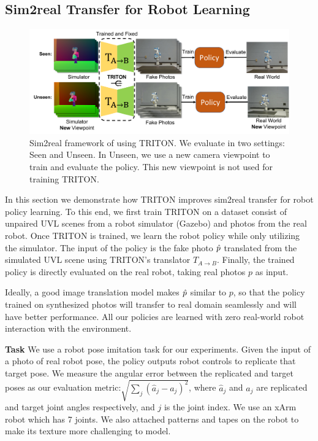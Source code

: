 \documentclass{article}
\begin{document}
\subsection{Sim2real Transfer for Robot Learning}
\begin{figure}[thbp]
    \centering
    \vspace{-10pt}
    \includegraphics[width=.8\textwidth]{../images/sim2real_framework.pdf}
    \vspace{-10pt}
    \caption{Sim2real framework of using TRITON. We evaluate in two settings: Seen and Unseen. In Unseen, we use a new camera viewpoint to train and evaluate the policy. This new viewpoint is not used for training TRITON. }
    \vspace{-5pt}
    \label{fig:sim2realframework}
\end{figure}
In this section we demonstrate how TRITON improves sim2real transfer for robot policy learning. To this end, we first train TRITON on a dataset consist of unpaired UVL scenes from a robot simulator (Gazebo) and photos from the real robot. Once TRITON is trained, we learn the robot policy while only utilizing the simulator. The input of the policy is the fake photo $\hat{p}$ translated from the simulated UVL scene using TRITON's translator $T_{A\to B}$. Finally, the trained policy is directly evaluated on the real robot, taking real photos $p$ as input.

Ideally, a good image translation model makes $\hat{p}$ similar to $p$, so that the policy trained on synthesized photos will transfer to real domain seamlessly and will have better performance. All our policies are learned with zero real-world robot interaction with the environment.

\textbf{Task} We use a robot pose imitation task for our experiments. Given the input of a photo of real robot pose, the policy outputs robot controls to replicate that target pose. We measure the angular error between the replicated and target poses as our evaluation metric:$\sqrt{\sum_{j} (\hat{a}_j - a_j)^2}$,
where $\hat{a}_j$ and $a_j$ are replicated and target joint angles respectively, and $j$ is the joint index. We use an xArm robot which has 7 joints. We also attached patterns and tapes on the robot to make its texture more challenging to model.
\end{document}
